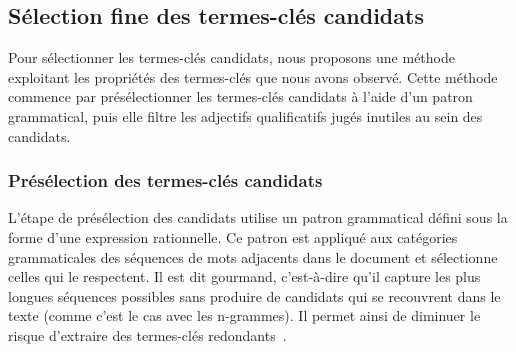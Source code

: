     \subsection{Sélection fine des termes-clés candidats}
    \label{subsec:main:domain_independent_keyphrase_extraction-keyphrase_candidate_selection-modifiers_filtering}
      Pour sélectionner les termes-clés candidats, nous proposons une méthode
      exploitant les propriétés des termes-clés que nous avons observé. Cette
      méthode commence par présélectionner les termes-clés candidats à l'aide
      d'un patron grammatical, puis elle filtre les adjectifs qualificatifs
      jugés inutiles au sein des candidats.

      \subsubsection{Présélection des termes-clés candidats}
      \label{subsubsec:main:domain_independent_keyphrase_extraction-keyphrase_candidate_selection-modifiers_filtering-candidate_pre_selection}
        L'étape de présélection des candidats utilise un patron grammatical
        défini sous la forme d'une expression rationnelle. Ce patron est
        appliqué aux catégories grammaticales des séquences de mots adjacents
        dans le document et sélectionne celles qui le respectent. Il est dit
        \og{}gourmand\fg{}, c'est-à-dire qu'il capture les plus longues
        séquences possibles sans produire de candidats qui se recouvrent dans le
        texte (comme c'est le cas avec les n-grammes). Il permet ainsi de
        diminuer le risque d'extraire des termes-clés
        redondants~\cite{hasan2014state_of_the_art}.

